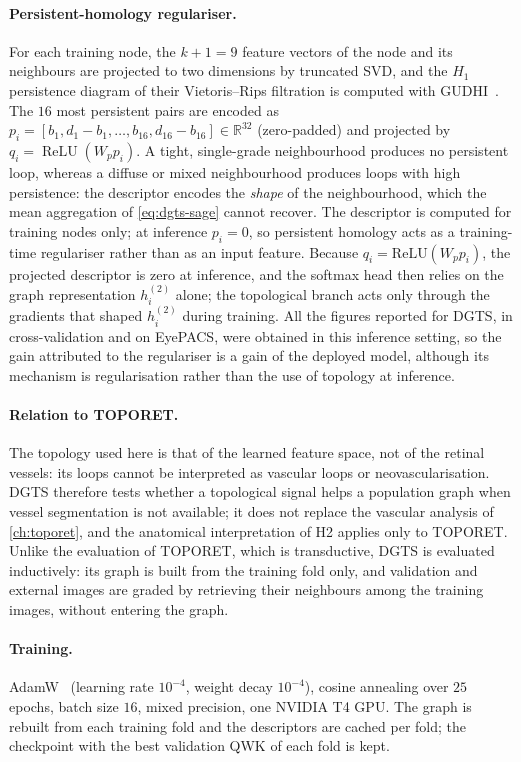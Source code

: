 \paragraph{Persistent-homology regulariser.}
For each training node, the $k+1=9$ feature vectors of the node and its neighbours are
projected to two dimensions by truncated SVD, and the $H_1$ persistence diagram of their
Vietoris--Rips filtration is computed with GUDHI~\cite{maria2014gudhi}. The $16$ most
persistent pairs are encoded as $p_i=[b_1,d_1-b_1,\ldots,b_{16},d_{16}-b_{16}]\in\mathbb{R}^{32}$
(zero-padded) and projected by $q_i=\operatorname{ReLU}(W_p p_i)$. A tight, single-grade
neighbourhood produces no persistent loop, whereas a diffuse or mixed neighbourhood
produces loops with high persistence: the descriptor encodes the \emph{shape} of the
neighbourhood, which the mean aggregation of \cref{eq:dgts-sage} cannot recover. The
descriptor is computed for training nodes only; at inference $p_i=0$, so persistent
homology acts as a training-time regulariser rather than as an input feature. Because
$q_i=\mathrm{ReLU}(W_p p_i)$, the projected descriptor is zero at inference, and the softmax
head then relies on the graph representation $h_i^{(2)}$ alone; the topological branch acts
only through the gradients that shaped $h_i^{(2)}$ during training. All the figures reported
for DGTS, in cross-validation and on EyePACS, were obtained in this inference setting, so the
gain attributed to the regulariser is a gain of the deployed model, although its mechanism
is regularisation rather than the use of topology at inference.

\paragraph{Relation to TOPORET.}
The topology used here is that of the learned feature space, not of the retinal vessels:
its loops cannot be interpreted as vascular loops or neovascularisation. DGTS therefore
tests whether a topological signal helps a population graph when vessel segmentation is
not available; it does not replace the vascular analysis of \cref{ch:toporet}, and the
anatomical interpretation of H2 applies only to TOPORET. Unlike the
evaluation of TOPORET, which is transductive, DGTS is evaluated inductively: its graph is
built from the training fold only, and validation and external images are graded by
retrieving their neighbours among the training images, without entering the graph.

\paragraph{Training.}
AdamW~\cite{kingma2015adam} (learning rate $10^{-4}$, weight decay $10^{-4}$), cosine
annealing over $25$ epochs, batch size $16$, mixed precision, one NVIDIA T4 GPU. The graph is
rebuilt from each training fold and the descriptors are cached per fold; the checkpoint with
the best validation QWK of each fold is kept.

